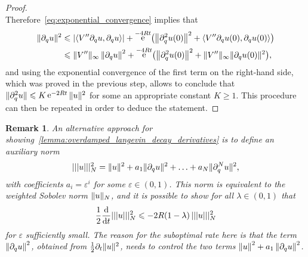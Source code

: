 \documentclass[11pt,a4paper]{article}
\DeclareMathOperator{\e}{e}
\theoremstyle{plain}
\newtheorem{remark}{Remark}[section]
\numberwithin{equation}{section}
\renewcommand{\leq}{\leqslant}
\renewcommand{\geq}{\geqslant}
\begin{document}
\begin{proof}
\[    \]
    Therefore~\eqref{eq:exponential_convergence} implies that
    \begin{align*}
        \norm*{\partial_q u}^2
        &\leq \abs{\ip{V'' \partial_q u}{\partial_q u}} + \e^{-4Rt} \bigl( \norm{\partial_q^2 u(0)}^2 + \ip{V'' \partial_q u(0)}{\partial_q u(0)} \bigr) \\
        &\leq \norm*{V''}_{\infty} \norm{\partial_q u}^2 + \e^{-4Rt} \bigl( \norm{\partial_q^2 u(0)}^2 + \norm*{V''}_{\infty} \norm*{\partial_q u(0)}^2 \bigr),
    \end{align*}
    and using the exponential convergence of the first term on the right-hand side,
    which was proved in the previous step,
    allows to conclude that $\norm*{\partial_q^2 u} \leq K \e^{-2 Rt} \norm*{u}^2$ for some an appropriate constant $K \geq 1$.
    This procedure can then be repeated in order to deduce the statement.
\end{proof}
\begin{remark}
    An alternative approach for showing~\cref{lemma:overdamped_langevin_decay_derivatives} is
    to define an auxiliary norm
    \[
        ||| u |||_N^2 = \norm*{u}^2 + a_1 \norm*{\partial_q u}^2 + \dotsc + a_N \norm*{\partial_q^N u}^2,
    \]
    with coefficients $a_i = \varepsilon^i$ for some $\varepsilon \in (0, 1)$.
    This norm is equivalent to the weighted Sobolev norm $\norm*{u}_N$,
    and it is possible to show for all $\lambda \in (0, 1)$ that
    \[
        \frac{1}{2}\derivative*{1}{t} |||u|||_N^2 \leq - 2 R(1 - \lambda) \, |||u|||_N^2
    \]
    for $\varepsilon$ sufficiently small.
    The reason for the suboptimal rate here is that the term $\norm{\partial_q u}^2$,
    obtained from $\frac{1}{2} \partial_t \norm*{u}^2$,
    needs to control the two terms $\norm{u}^2 + a_1 \norm{\partial_q u}^2$.
\end{remark}



\end{document}
